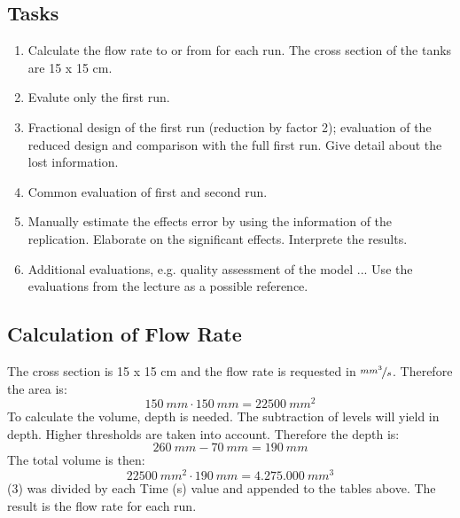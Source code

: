 \subsection{Tasks}
\begin{enumerate}
\item Calculate the flow rate to or from  for each run. The cross section of the tanks are 15 x 15 cm.
\item Evalute only the first run.
\item Fractional design of the first run (reduction by factor 2); evaluation of the reduced design and comparison with the full first run. Give detail about the lost information.
\item Common evaluation of first and second run.
\item Manually estimate the effects error by using the information of the replication. Elaborate on the significant effects. Interprete the results.
\item Additional evaluations, e.g. quality assessment of the model ... Use the evaluations from the lecture as a possible reference.
\end{enumerate}

\subsection{Calculation of Flow Rate}
The cross section is 15 x 15 cm and the flow rate is requested in $\nicefrac{mm^3}{s}$. Therefore the area is:
\begin{equation}
150\:mm \cdot 150\:mm = 22500\:mm^2
\end{equation}
To calculate the volume, depth is needed. The subtraction of levels will yield in depth. Higher thresholds are taken into account. Therefore the depth is:
\begin{equation}
260\:mm - 70\:mm = 190\:mm
\end{equation}
The total volume is then:
\begin{equation}
22500\:mm^2 \cdot 190\:mm = 4.275.000\:mm^3
\end{equation}
(3) was divided by each Time (s) value and appended to the tables above. The result is the flow rate for each run.

